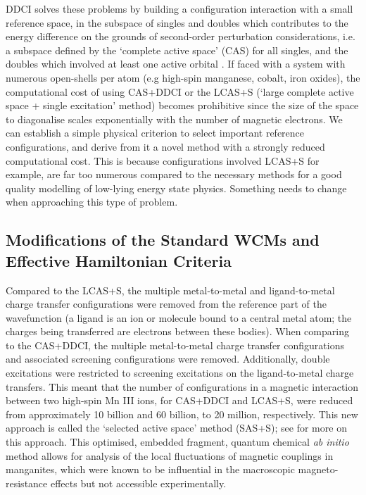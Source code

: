 \documentclass[10pt]{article}
\begin{document}
DDCI solves these problems by building a configuration interaction with a small reference space, in the subspace of singles and doubles which contributes to the energy difference on the grounds of second-order perturbation considerations, i.e. a subspace defined by the `complete active space' (CAS) for all singles, and the doubles which involved at least one active orbital \cite{garcia1997application}. If faced with a system with numerous open-shells per atom (e.g high-spin manganese, cobalt, iron oxides), the computational cost of using CAS+DDCI or the LCAS+S (`large complete active space + single excitation' method) becomes prohibitive since the size of the space to diagonalise scales exponentially with the number of magnetic electrons. We can establish a simple physical criterion to select important reference configurations, and derive from it a novel method with a strongly reduced computational cost. This is because configurations involved LCAS+S for example, are far too numerous compared to the necessary methods for a good quality modelling of low-lying energy state physics. Something needs to change when approaching this type of problem.

\subsection{Modifications of the Standard WCMs and Effective Hamiltonian Criteria}

Compared to the LCAS+S, the multiple metal-to-metal and ligand-to-metal charge transfer configurations were removed from the reference part of the wavefunction (a ligand is an ion or molecule bound to a central metal atom; the charges being transferred are electrons between these bodies). When comparing to the CAS+DDCI, the multiple metal-to-metal charge transfer configurations and associated screening configurations were removed. Additionally, double excitations were restricted to screening excitations on the ligand-to-metal charge transfers. This meant that the number of configurations in a magnetic interaction between two high-spin Mn III ions, for CAS+DDCI and LCAS+S, were reduced from approximately 10 billion and 60 billion, to 20 million, respectively. This new approach is called the `selected active space' method (SAS+S); see \cite{gelle2009accurate} for more on this approach. This optimised, embedded fragment, quantum chemical {\it ab initio} method allows for analysis of the local fluctuations of magnetic couplings in manganites, which were known to be influential in the macroscopic magneto-resistance effects but not accessible experimentally.
\end{document}
